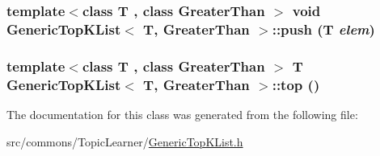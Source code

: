 \label{class_generic_top_k_list_a055c25c654e83e69b7db1f3247b169a3}
\hypertarget{class_generic_top_k_list_a6ab837a0bcd3f93a543f2cf6a6bc2ce3}{
\subsubsection[{push}]{\setlength{\rightskip}{0pt plus 5cm}template$<$class T , class GreaterThan $>$ void {\bf GenericTopKList}$<$ T, GreaterThan $>$::push (T {\em elem})}}
\label{class_generic_top_k_list_a6ab837a0bcd3f93a543f2cf6a6bc2ce3}
\hypertarget{class_generic_top_k_list_a5ad239650c74d5545d24123ea181728e}{
\subsubsection[{top}]{\setlength{\rightskip}{0pt plus 5cm}template$<$class T , class GreaterThan $>$ T {\bf GenericTopKList}$<$ T, GreaterThan $>$::top ()}}
\label{class_generic_top_k_list_a5ad239650c74d5545d24123ea181728e}


The documentation for this class was generated from the following file:\begin{DoxyCompactItemize}
\item 
src/commons/TopicLearner/\hyperlink{_generic_top_k_list_8h}{GenericTopKList.h}\end{DoxyCompactItemize}
